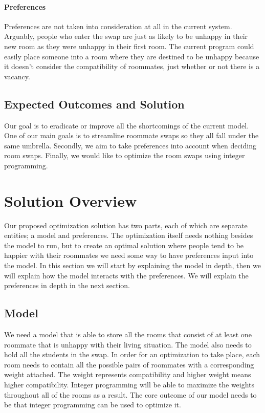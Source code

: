 \documentclass[12pt]{article}
\begin{document}
\paragraph{Preferences}
Preferences are not taken into consideration at all in the current system. Arguably, people who enter the swap are just as likely to be unhappy in their new room as they were unhappy in their first room. The current program could easily place someone into a room where they are destined to be unhappy because it doesn't consider the compatibility of roommates, just whether or not there is a vacancy. 

\subsection{Expected Outcomes and Solution}
Our goal is to eradicate or improve all the shortcomings of the current model. One of our main goals is to streamline roommate swaps so they all fall under the same umbrella. Secondly, we aim to take preferences into account when deciding room swaps. Finally, we would like to optimize the room swaps using integer programming.

\section{Solution Overview}
Our proposed optimization solution has two parts, each of which are separate entities; a model and preferences. The optimization itself needs nothing besides the model to run, but to create an optimal solution where people tend to be happier with their roommates we need some way to have preferences input into the model. In this section we will start by explaining the model in depth, then we will explain how the model interacts with the preferences. We will explain the preferences in depth in the next section.

\subsection{Model}
We need a model that is able to store all the rooms that consist of at least one roommate that is unhappy with their living situation. The model also needs to hold all the students in the swap. In order for an optimization to take place, each room needs to contain all the possible pairs of roommates with a corresponding weight attached. The weight represents compatibility and higher weight means higher compatibility. Integer programming will be able to maximize the weights throughout all of the rooms as a result. The core outcome of our model needs to be that integer programming can be used to optimize it.
\end{document}

